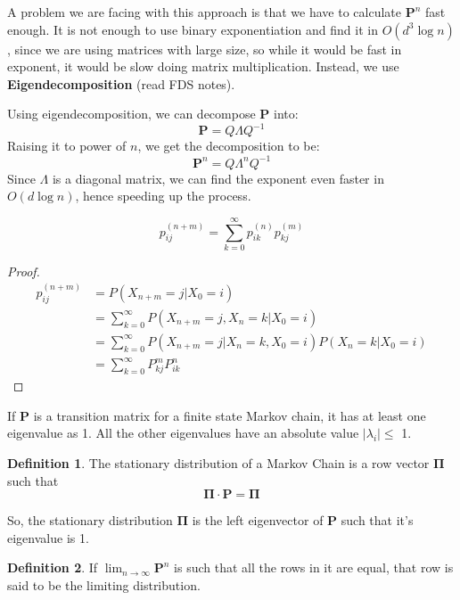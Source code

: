 \documentclass[12pt,letterpaper]{amsbook}
\theoremstyle{definition}
\newtheorem{definition}{Definition}%
\begin{document}
A problem we are facing with this approach is that we have to calculate $\mathbf{P}^{n}$ fast enough. It is not enough to use binary exponentiation and find it in $O(d^3\log{n})$, since we are using matrices with large size, so while it would be fast in exponent, it would be slow doing matrix multiplication. Instead, we use \textbf{Eigendecomposition} (read FDS notes).

Using eigendecomposition, we can decompose $\mathbf{P}$ into:
\[\mathbf{P} = Q \Lambda Q^{-1}\]
Raising it to power of $n$, we get the decomposition to be:
\[\mathbf{P}^n = Q \Lambda^n Q^{-1}\]
Since $\Lambda$ is a diagonal matrix, we can find the exponent even faster in $O(d\log n)$, hence speeding up the process.

\begin{theorem}
  \[p_{ij}^{(n+m)} = \sum_{k=0}^{\infty} p_{ik}^{(n)}p_{kj}^{(m)}\]
\end{theorem}
\begin{proof}
  \begin{align*}
    p_{ij}^{(n+m)} &= P(X_{n+m} = j | X_0 = i) \\
                   &= \sum_{k=0}^{\infty} P(X_{n+m} = j, X_n = k | X_0 = i) \\ 
                   &= \sum_{k=0}^{\infty} P(X_{n+m} = j | X_n=k, X_0 = i) P(X_n = k | X_0 =i) \\
                   &= \sum_{k=0}^{\infty} P_{kj}^m P_{ik}^n
  \end{align*}  
\end{proof}

\begin{theorem}
  If $\mathbf{P}$ is a transition matrix for a finite state Markov chain, it has at least one eigenvalue as 1.  All the other eigenvalues have an absolute value $|\lambda_i| \leq$ 1.
\end{theorem}

\begin{definition}
  The stationary distribution of a Markov Chain is a row vector $\mathbf{\Pi}$ such that 
  \[\mathbf{\Pi} \cdot \mathbf{P} = \mathbf{\Pi}\]
\end{definition}

So, the stationary distribution $\mathbf{\Pi}$ is the left eigenvector of $\mathbf{P}$ such that it's eigenvalue is 1.

\begin{definition}
  If $\lim_{n \rightarrow \infty} \mathbf{P}^n$ is such that all the rows in it are equal, that row is said to be the limiting distribution.
\end{definition}
\end{document}
